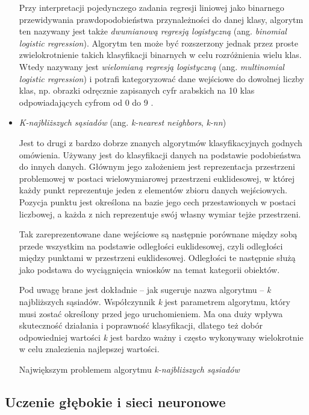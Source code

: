 \begin{itemize}
        Przy interpretacji pojedynczego zadania regresji liniowej jako binarnego przewidywania prawdopodobieństwa przynależności do danej klasy, algorytm ten nazywany jest także \emph{dwumianową regresją logistyczną} (ang. \emph{binomial logistic regression}).
        Algorytm ten może być rozszerzony jednak przez proste zwielokrotnienie takich klasyfikacji binarnych w celu rozróżnienia wielu klas.
        Wtedy nazywany jest \emph{wielomianą regresją logistyczną} (ang. \emph{multinomial logistic regression}) i potrafi kategoryzować dane wejściowe do dowolnej liczby klas, np. obrazki odręcznie zapisanych cyfr arabskich na 10 klas odpowiadających cyfrom od 0 do 9 \cite{palvanov2018comparisons}.

  \item \emph{K-najbliższych sąsiadów} (ang. \emph{k-nearest neighbors}, \emph{k-nn})

        Jest to drugi z bardzo dobrze znanych algorytmów klasyfikacyjnych godnych omówienia.
        Używany jest do klasyfikacji danych na podstawie podobieństwa do innych danych.
        Głównym jego założeniem jest reprezentacja przestrzeni problemowej w postaci wielowymiarowej przestrzeni euklidesowej, w której każdy punkt reprezentuje jeden z elementów zbioru danych wejściowych.
        Pozycja punktu jest określona na bazie jego cech przestawionych w postaci liczbowej, a każda z nich reprezentuje swój własny wymiar tejże przestrzeni.

        Tak zareprezentowane dane wejściowe są następnie porównane między sobą przede wszystkim na podstawie odległości euklidesowej, czyli odległości między punktami w przestrzeni euklidesowej.
        Odległości te następnie służą jako podstawa do wyciągnięcia wniosków na temat kategorii obiektów.

        Pod uwagę brane jest dokładnie -- jak sugeruje nazwa algorytmu --  \emph{k} najbliższych sąsiadów.
        Współczynnik \emph{k} jest parametrem algorytmu, który musi zostać określony przed jego uruchomieniem.
        Ma ona duży wpływa skuteczność działania i poprawność klasyfikacji, dlatego też dobór odpowiedniej wartości \emph{k} jest bardzo ważny i często wykonywany wielokrotnie w celu znalezienia najlepszej wartości.

        Największym problemem algorytmu \emph{k-najbliższych sąsiadów}

\end{itemize}

\subsection{Uczenie głębokie i sieci neuronowe}

